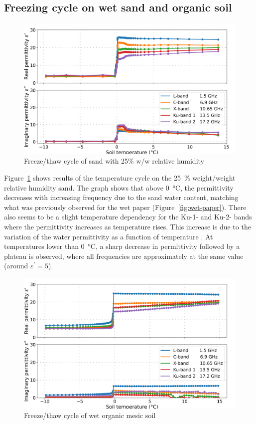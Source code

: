 \subsection{Freezing cycle on wet sand and organic soil}

\begin{figure}[ht!]
    \centering
    \includegraphics[width=\columnwidth]{Images/wet-sand.png}
    \caption[]{Freeze/thaw cycle of sand with 25\% w/w relative humidity}\label{fig:wet-sand}
\end{figure}

Figure~\ref{fig:wet-sand} shows results of the temperature cycle on the \qty{25}{\percent} weight/weight relative humidity sand.
The graph shows that above \qty{0}{\degreeCelsius}, the permittivity decreases with increasing frequency due to the sand water content, matching what was previously observed for the wet paper (Figure~\ref{fig:wet-paper}).
There also seems to be a slight temperature dependency for the Ku-1- and Ku-2- bands where the permittivity increases as temperature rises.
This increase is due to the variation of the water permittivity as a function of temperature \parencite{Kaatze1989}.
At temperatures lower than \qty{0}{\degreeCelsius}, a sharp decrease in permittivity followed by a plateau is observed, where all frequencies are approximately at the same value (around \(\varepsilon^\prime = 5\)).

\begin{figure}[ht!]
    \centering
    \includegraphics[width=\columnwidth]{Images/wet-soil.png}
    \caption[]{Freeze/thaw cycle of wet organic mesic soil}\label{fig:wet-soil}
\end{figure}

